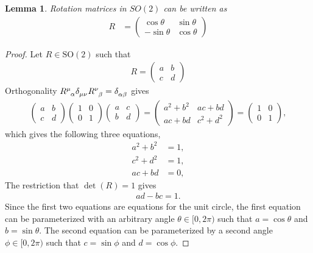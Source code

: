 \documentclass{amsart}
\newtheorem{lemma}[theorem]{Lemma}
\theoremstyle{definition}
\theoremstyle{remark}
\begin{document}
\begin{lemma}
  Rotation matrices in $SO(2)$ can be written as
  \begin{align*}
    R &=
    \begin{pmatrix}
      \cos \theta & \sin \theta \\
      -\sin \theta & \cos \theta
    \end{pmatrix}
  \end{align*}
\end{lemma}
\begin{proof}
  Let $R\in \mathrm{SO}(2)$ such that
  \begin{align*}
    R =
    \begin{pmatrix}
      a & b \\
      c & d
    \end{pmatrix}
  \end{align*}
  Orthogonality $\tensor{R}{^\mu_\alpha} \tensor{\delta}{_\mu_\nu} \tensor{R}{^\nu_\beta} = \tensor{\delta}{_\alpha_\beta}$ gives
  \begin{align*}
    \begin{pmatrix}
      a & b \\
      c & d
    \end{pmatrix}
    \begin{pmatrix}
      1 & 0 \\
      0 & 1
    \end{pmatrix}
    \begin{pmatrix}
      a & c \\
      b & d
    \end{pmatrix}
    =
    \begin{pmatrix}
      a^2 + b^2 & ac + bd \\
      ac + bd & c^2 + d^2
    \end{pmatrix}
    =
    \begin{pmatrix}
      1 & 0 \\ 0 & 1
    \end{pmatrix},
  \end{align*}
  which gives the following three equations,
  \begin{align*}
    a^2 + b^2 &= 1, \\
    c^2 + d^2 &= 1, \\
    ac + bd &= 0,
  \end{align*}
  The restriction that $\det(R)=1$ gives
  \begin{align*}
    ad - bc = 1.
  \end{align*}
  Since the first two equations are equations for the unit circle, the first equation can be parameterized with an arbitrary angle $\theta \in [0, 2\pi)$ such that $a = \cos\theta$ and $b = \sin\theta$. The second equation can be parameterized by a second angle $\phi \in [0, 2\pi)$ such that $c = \sin\phi$ and $d = \cos\phi$.

\end{proof}
\end{document}
